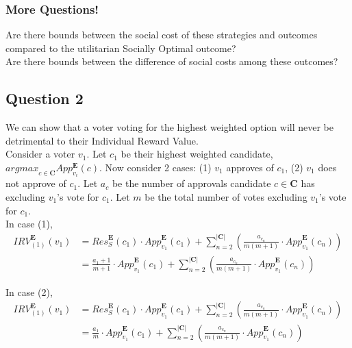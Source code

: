 \documentclass{article}
\begin{document}
\subsubsection{More Questions!}

Are there bounds between the social cost of these strategies and outcomes compared to the utilitarian Socially Optimal outcome?\\
Are there bounds between the difference of social costs among these outcomes?

\subsection{Question 2}
We can show that a voter voting for the highest weighted option will never be detrimental to their Individual Reward Value.\\

Consider a voter $v_{1}$. Let $c_{1}$ be their highest weighted candidate, ${argmax}_{c \in \boldsymbol{C}}App^{\boldsymbol{E}}_{v_{i}}(c)$. Now consider 2 cases: (1) $v_{1}$ approves of $c_{1}$, (2) $v_{1}$ does not approve of $c_{1}$. Let $a_{c}$ be the number of approvals candidate $c \in \boldsymbol{C}$ has excluding $v_{1}$'s vote for $c_{1}$. Let $m$ be the total number of votes excluding $v_{1}$'s vote for $c_{1}$.\\

In case (1), 
\begin{equation}
\begin{aligned}
{IRV}^{\boldsymbol{E}}_{(1)}(v_1) 
&= {Res}^{\boldsymbol{E}}_{S}(c_1)\cdot{App}^{\boldsymbol{E}}_{v_1}(c_1) + \sum^{|\boldsymbol{C}|}_{n = 2}{\left(\frac{a_{c_n}}{m(m+1)}\cdot{App}^{\boldsymbol{E}}_{v_1}(c_{n})\right)}\\
&= \frac{a_1+1}{m+1}\cdot{App}^{\boldsymbol{E}}_{v_1}(c_1) + \sum^{|\boldsymbol{C}|}_{n = 2}{\left(\frac{a_{c_n}}{m(m+1)}\cdot{App}^{\boldsymbol{E}}_{v_1}(c_{n})\right)}
\end{aligned}  
\end{equation}

In case (2), 
\begin{equation}
\begin{aligned}
{IRV}^{\boldsymbol{E}}_{(1)}(v_1) 
&= {Res}^{\boldsymbol{E}}_{S}(c_1)\cdot{App}^{\boldsymbol{E}}_{v_1}(c_1) + \sum^{|\boldsymbol{C}|}_{n = 2}{\left(\frac{a_{c_n}}{m(m+1)}\cdot{App}^{\boldsymbol{E}}_{v_1}(c_{n})\right)}\\
&= \frac{a_1}{m}\cdot{App}^{\boldsymbol{E}}_{v_1}(c_1) + \sum^{|\boldsymbol{C}|}_{n = 2}{\left(\frac{a_{c_n}}{m(m+1)}\cdot{App}^{\boldsymbol{E}}_{v_1}(c_{n})\right)}
\end{aligned}  
\end{equation}
\end{document}
